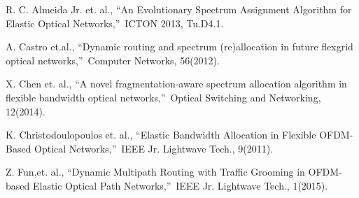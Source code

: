 \documentclass[letterpaper,10pt]{article}\pdfoutput=1
\begin{document}
\begin{thebibliography}{8}
{\footnotesize
{}R. C. Almeida Jr. et. al., 
\textquotedblleft An Evolutionary Spectrum Assignment Algorithm for Elastic Optical Networks,\textquotedblright\ 
ICTON 2013, Tu.D4.1.

A. Castro et.al.,
\textquotedblleft Dynamic routing and spectrum (re)allocation in future flexgrid
optical networks,\textquotedblright\ Computer Networks, 56(2012).

X. Chen et. al., 
\textquotedblleft A novel fragmentation-aware spectrum allocation algorithm
in flexible bandwidth optical networks,\textquotedblright\ Optical Switching and Networking, 12(2014).

K. Christodoulopoulos et. al.,
\textquotedblleft Elastic Bandwidth Allocation in Flexible OFDM-Based Optical Networks,\textquotedblright\
IEEE Jr. Lightwave Tech., 9(2011).

Z. Fun,et. al.,
\textquotedblleft Dynamic Multipath Routing with Traffic Grooming in OFDM-based Elastic Optical Path
Networks,\textquotedblright\ IEEE Jr. Lightwave Tech., 1(2015).
}
\end{thebibliography}
\end{document}
